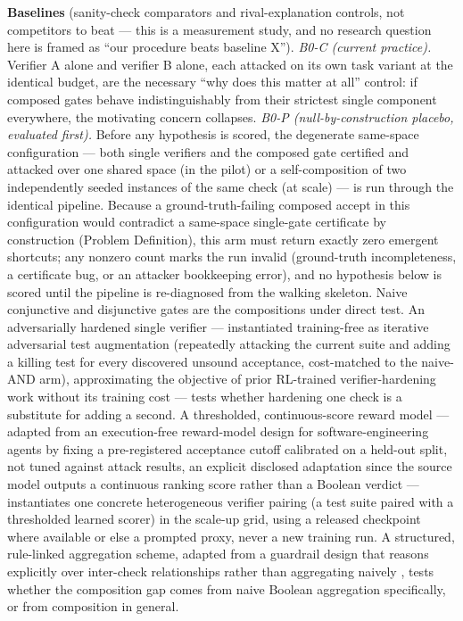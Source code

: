 \documentclass[11pt]{article}
\begin{document}
\label{sec:baselines-placebo}\textbf{Baselines} (sanity-check comparators and rival-explanation controls, not competitors to beat --- this is a measurement study, and no research question here is framed as ``our procedure beats baseline X''). \emph{B0-C (current practice).} Verifier A alone and verifier B alone, each attacked on its own task variant at the identical budget, are the necessary ``why does this matter at all'' control: if composed gates behave indistinguishably from their strictest single component everywhere, the motivating concern collapses. \emph{B0-P (null-by-construction placebo, evaluated first).} Before any hypothesis is scored, the degenerate same-space configuration --- both single verifiers and the composed gate certified and attacked over one shared space (in the pilot) or a self-composition of two independently seeded instances of the same check (at scale) --- is run through the identical pipeline. Because a ground-truth-failing composed accept in this configuration would contradict a same-space single-gate certificate by construction (Problem Definition), this arm must return exactly zero emergent shortcuts; any nonzero count marks the run invalid (ground-truth incompleteness, a certificate bug, or an attacker bookkeeping error), and no hypothesis below is scored until the pipeline is re-diagnosed from the walking skeleton. Naive conjunctive and disjunctive gates are the compositions under direct test. An adversarially hardened single verifier --- instantiated training-free as iterative adversarial test augmentation (repeatedly attacking the current suite and adding a killing test for every discovered unsound acceptance, cost-matched to the naive-AND arm), approximating the objective of prior RL-trained verifier-hardening work \citep{utrl2508} without its training cost --- tests whether hardening one check is a substitute for adding a second. A thresholded, continuous-score reward model --- adapted from an execution-free reward-model design for software-engineering agents \citep{swerm2512} by fixing a pre-registered acceptance cutoff calibrated on a held-out split, not tuned against attack results, an explicit disclosed adaptation since the source model outputs a continuous ranking score rather than a Boolean verdict --- instantiates one concrete heterogeneous verifier pairing (a test suite paired with a thresholded learned scorer) in the scale-up grid, using a released checkpoint where available or else a prompted proxy, never a new training run. A structured, rule-linked aggregation scheme, adapted from a guardrail design that reasons explicitly over inter-check relationships rather than aggregating naively \citep{r2guard2407}, tests whether the composition gap comes from naive Boolean aggregation specifically, or from composition in general.
\end{document}
